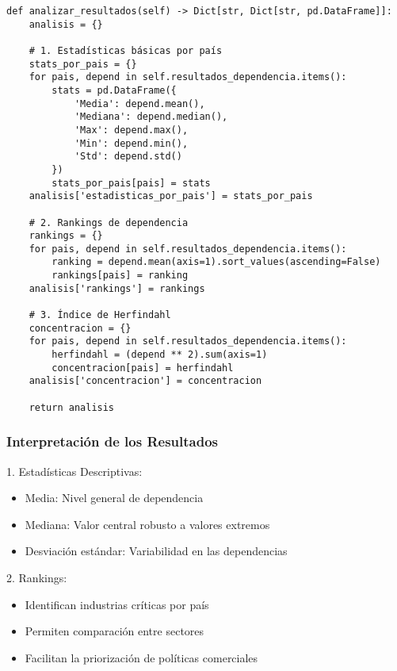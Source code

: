 \documentclass[11pt,a4paper]{article}
\begin{document}
\begin{tcolorbox}[colback=codebackground,title=Implementación del Método]
\begin{lstlisting}
def analizar_resultados(self) -> Dict[str, Dict[str, pd.DataFrame]]:
    analisis = {}
    
    # 1. Estadísticas básicas por país
    stats_por_pais = {}
    for pais, depend in self.resultados_dependencia.items():
        stats = pd.DataFrame({
            'Media': depend.mean(),
            'Mediana': depend.median(),
            'Max': depend.max(),
            'Min': depend.min(),
            'Std': depend.std()
        })
        stats_por_pais[pais] = stats
    analisis['estadisticas_por_pais'] = stats_por_pais
    
    # 2. Rankings de dependencia
    rankings = {}
    for pais, depend in self.resultados_dependencia.items():
        ranking = depend.mean(axis=1).sort_values(ascending=False)
        rankings[pais] = ranking
    analisis['rankings'] = rankings
    
    # 3. Índice de Herfindahl
    concentracion = {}
    for pais, depend in self.resultados_dependencia.items():
        herfindahl = (depend ** 2).sum(axis=1)
        concentracion[pais] = herfindahl
    analisis['concentracion'] = concentracion
    
    return analisis
\end{lstlisting}
\end{tcolorbox}

\subsubsection{Interpretación de los Resultados}

1. Estadísticas Descriptivas:
\begin{itemize}
    \item Media: Nivel general de dependencia
    \item Mediana: Valor central robusto a valores extremos
    \item Desviación estándar: Variabilidad en las dependencias
\end{itemize}

2. Rankings:
\begin{itemize}
    \item Identifican industrias críticas por país
    \item Permiten comparación entre sectores
    \item Facilitan la priorización de políticas comerciales
\end{itemize}
\end{document}
